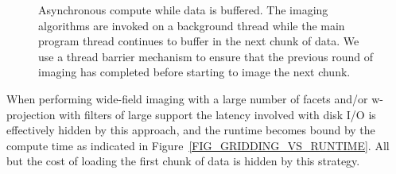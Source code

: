 \begin{figure}[ht!]
 \begin{mdframed}
 \centering
 \caption[Aynchronous compute]{Asynchronous compute while data is buffered. The imaging algorithms are invoked on a background thread while the main 
 program thread continues to buffer in the next chunk of data. We use a thread barrier mechanism to ensure that the previous round of imaging has completed before starting
 to image the next chunk.}
 \label{fig_async_compute}
 \end{mdframed}
\end{figure}

When performing wide-field imaging with a large number of facets and/or w-projection with filters of large support the latency involved with disk
I/O is effectively hidden by this approach, and the runtime becomes bound by the compute time as indicated in Figure~\ref{FIG_GRIDDING_VS_RUNTIME}. 
All but the cost of loading the first chunk of data is hidden by this strategy.

